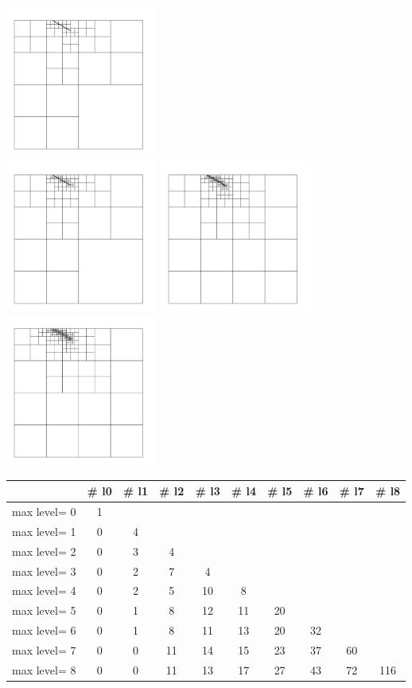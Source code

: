 \includegraphics[width=5cm]{images/meshes/AMR/amr5}\\
\includegraphics[width=5cm]{images/meshes/AMR/amr6}
\includegraphics[width=5cm]{images/meshes/AMR/amr7}
\includegraphics[width=5cm]{images/meshes/AMR/amr8}

\begin{tabular}{l|ccccccccc}
             & \# l0  & \# l1 & \# l2 & \# l3 & \# l4 & \# l5 & \# l6 & \# l7 & \# l8 \\ 
\hline\hline
max level= 0 & 1 & \\
max level= 1 & 0 & 4 & \\
max level= 2 & 0 & 3 & 4 \\
max level= 3 & 0 & 2 & 7 & 4\\
max level= 4 & 0 & 2 & 5 & 10 & 8 \\
max level= 5 & 0 & 1 & 8 & 12 & 11 & 20 \\ 
max level= 6 & 0 & 1 & 8 & 11 & 13 & 20 & 32 \\
max level= 7 & 0 & 0 & 11 & 14 & 15 & 23 & 37 & 60 \\
max level= 8 & 0 & 0 & 11 & 13 & 17 & 27 & 43 & 72 & 116 \\
\hline
\end{tabular}


